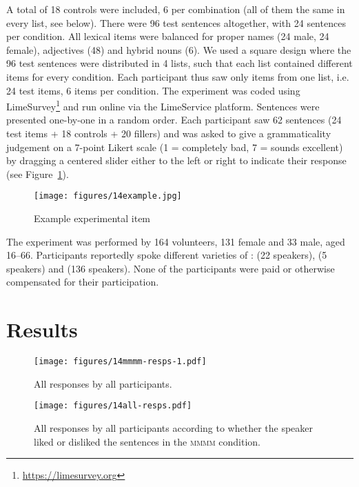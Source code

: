 \documentclass[output=paper,modfonts,newtxmath,hidelinks]{langscibook}
\begin{document}
\noindent A total of 18 controls were included, 6 per combination (all of them the same in every list, see below).			
There were 96 test sentences altogether, with 24 sentences per condition. All lexical items were balanced for proper names (24 male, 24 female), adjectives (48) and hybrid nouns (6).
 We used a  square design where the 96 test sentences were distributed in 4 lists, such that each list contained different items for every condition. 
 Each participant thus saw only items from one list, i.e. 24 test items, 6 items per condition. 
 The experiment was coded using LimeSurvey\footnote{\url{https://limesurvey.org}} and run online via the LimeService platform.
  	 Sentences were presented one-by-one in a random order. 
Each participant saw 62 sentences (24 test items + 18 controls + 20 fillers)  
 and was asked to give a grammaticality judgement on a 7-point Likert scale (1 = completely bad, 7 = sounds excellent) by dragging a centered slider either to the left or right to indicate their response (see Figure~\ref{14:slider}). 
  		
  		\begin{figure}[t]
  			\centering
  			\texttt{[image: figures/14example.jpg]}
  			\caption{Example experimental item }
			\label{14:slider}
  		\end{figure}
 		
 The experiment was performed by 164 volunteers, 131 female and 33 male, aged 16--66. Participants reportedly spoke different varieties of :  (22 speakers),  (5 speakers) and  (136 speakers).
 None of the participants were paid or otherwise compensated for their participation.

\section{Results}


\begin{figure}[t]
		\centering
		\texttt{[image: figures/14mmmm-resps-1.pdf]}
		\caption{All responses by all participants.}\label{14:fig:all-resps}
	\end{figure}


% 

\begin{figure}[b]
	\centering
	\texttt{[image: figures/14all-resps.pdf]}
	\caption{All responses by all participants according to whether the speaker liked or disliked the sentences in the \textsc{mmmm} condition.}\label{14:fig:all-resps-mmmm}
\end{figure}
\end{document}
